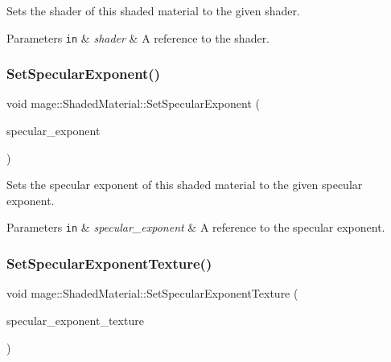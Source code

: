 Sets the shader of this shaded material to the given shader.


\begin{DoxyParams}[1]{Parameters}
\mbox{\tt in}  & {\em shader} & A reference to the shader. \\
\hline
\end{DoxyParams}
\hypertarget{structmage_1_1_shaded_material_ae9c4286f2802a30698863c9abe95e60d}{}\label{structmage_1_1_shaded_material_ae9c4286f2802a30698863c9abe95e60d} 
\subsubsection{\texorpdfstring{Set\+Specular\+Exponent()}{SetSpecularExponent()}}
{\footnotesize\ttfamily void mage\+::\+Shaded\+Material\+::\+Set\+Specular\+Exponent (\begin{DoxyParamCaption}\item[{float}]{specular\+\_\+exponent }\end{DoxyParamCaption})\hspace{0.3cm}{\ttfamily [noexcept]}}

Sets the specular exponent of this shaded material to the given specular exponent.


\begin{DoxyParams}[1]{Parameters}
\mbox{\tt in}  & {\em specular\+\_\+exponent} & A reference to the specular exponent. \\
\hline
\end{DoxyParams}
\hypertarget{structmage_1_1_shaded_material_a5ef7c32a67a49814a448667779cfcb4b}{}\label{structmage_1_1_shaded_material_a5ef7c32a67a49814a448667779cfcb4b} 
\subsubsection{\texorpdfstring{Set\+Specular\+Exponent\+Texture()}{SetSpecularExponentTexture()}}
{\footnotesize\ttfamily void mage\+::\+Shaded\+Material\+::\+Set\+Specular\+Exponent\+Texture (\begin{DoxyParamCaption}\item[{\hyperlink{namespacemage_a1e01ae66713838a7a67d30e44c67703e}{Shared\+Ptr}$<$ \hyperlink{classmage_1_1_texture}{Texture} $>$}]{specular\+\_\+exponent\+\_\+texture }\end{DoxyParamCaption})}


